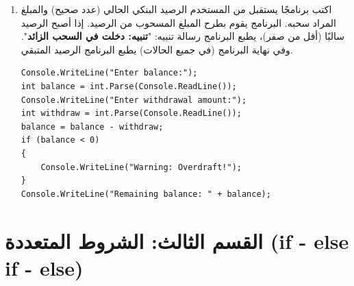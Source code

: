 \documentclass[14pt]{extarticle}
\begin{document}
\begin{enumerate}[resume, itemsep=2em]
\filbreak
\item
اكتب برنامجًا يستقبل من المستخدم الرصيد البنكي الحالي (عدد صحيح) والمبلغ المراد سحبه. البرنامج يقوم بطرح المبلغ المسحوب من الرصيد. إذا أصبح الرصيد سالبًا (أقل من صفر)، يطبع البرنامج رسالة تنبيه: "\textbf{تنبيه: دخلت في السحب الزائد}". وفي نهاية البرنامج (في جميع الحالات) يطبع البرنامج الرصيد المتبقي.
\ifwithsols
\begin{boxSolution}
\begin{english}
\begin{verbatim}
Console.WriteLine("Enter balance:");
int balance = int.Parse(Console.ReadLine());
Console.WriteLine("Enter withdrawal amount:");
int withdraw = int.Parse(Console.ReadLine());
balance = balance - withdraw;
if (balance < 0)
{
    Console.WriteLine("Warning: Overdraft!");
}
Console.WriteLine("Remaining balance: " + balance);
\end{verbatim}
\end{english}
\end{boxSolution}
\fi

\end{enumerate}

\clearpage
\section*{القسم الثالث: الشروط المتعددة (\textenglish{if - else if - else})}
\end{document}
